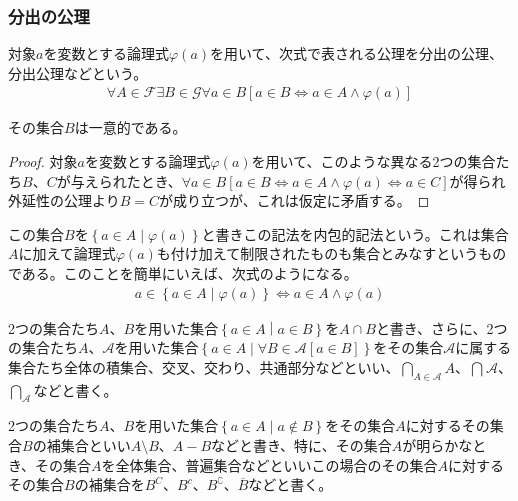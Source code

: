 \documentclass[a4paper]{jsarticle}
\begin{document}
\subsubsection{分出の公理}%
\begin{axs}\label{分出の公理}
対象$a$を変数とする論理式$\varphi(a)$を用いて、次式で表される公理を分出の公理、分出公理などという。
\begin{align*}
\forall A\in \mathcal{F\exists}B \in \mathcal{G\forall}a \in B\left[ a \in B \Leftrightarrow a \in A \land \varphi(a) \right]
\end{align*}
\end{axs}
\begin{thm}
\label{1.2.1.8}
その集合$B$は一意的である。
\end{thm}
\begin{proof}
対象$a$を変数とする論理式$\varphi(a)$を用いて、このような異なる2つの集合たち$B$、$C$が与えられたとき、$\forall a \in B\left[ a \in B \Leftrightarrow a \in A \land \varphi(a) \Leftrightarrow a \in C \right]$が得られ外延性の公理より$B = C$が成り立つが、これは仮定に矛盾する。
\end{proof}
\begin{dfn}
この集合$B$を$\left\{ a \in A \middle| \varphi(a) \right\}$と書きこの記法を内包的記法という。これは集合$A$に加えて論理式$\varphi(a)$も付け加えて制限されたものも集合とみなすというものである。このことを簡単にいえば、次式のようになる。
\begin{align*}
a \in \left\{ a \in A \middle| \varphi(a) \right\} \Leftrightarrow a \in A \land \varphi(a)
\end{align*}
\end{dfn}
\begin{dfn}
2つの集合たち$A$、$B$を用いた集合$\left\{ a \in A \middle| a \in B \right\}$を$A \cap B$と書き、さらに、2つの集合たち$A$、$\mathcal{A}$を用いた集合$\left\{ a \in A \middle| \forall B\in \mathcal{A}[ a \in B] \right\}$をその集合$\mathcal{A}$に属する集合たち全体の積集合、交叉、交わり、共通部分などといい、$\bigcap_{A \in \mathcal{A}} A$、$\bigcap_{} \mathcal{A}$、$\bigcap_{\mathcal{A}} $などと書く。
\end{dfn}
\begin{dfn}
2つの集合たち$A$、$B$を用いた集合$\left\{ a \in A \middle| a \notin B \right\}$をその集合$A$に対するその集合$B$の補集合といい$A \setminus B$、$A - B$などと書き、特に、その集合$A$が明らかなとき、その集合$A$を全体集合、普遍集合などといいこの場合のその集合$A$に対するその集合$B$の補集合を$B^{C}$、$B^{c}$、$B^{\complement}$、$\overline{B}$などと書く。
\end{dfn}
\end{document}
